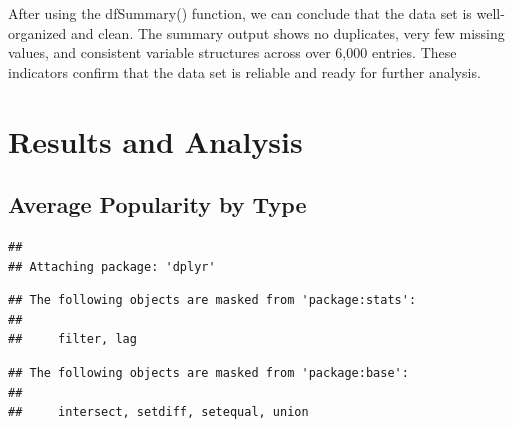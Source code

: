 \documentclass[11pt,preprint]{elsarticle}
\numberwithin{equation}{section}
\numberwithin{figure}{section}
\numberwithin{table}{section}
\begin{document}
After using the dfSummary() function, we can conclude that the data set
is well-organized and clean. The summary output shows no duplicates,
very few missing values, and consistent variable structures across over
6,000 entries. These indicators confirm that the data set is reliable
and ready for further analysis.

\section{Results and Analysis}\label{results-and-analysis}

\subsection{Average Popularity by
Type}\label{average-popularity-by-type}

\begin{Shaded}
\begin{Highlighting}[]
\end{Highlighting}
\end{Shaded}

\begin{verbatim}
## 
## Attaching package: 'dplyr'
\end{verbatim}

\begin{verbatim}
## The following objects are masked from 'package:stats':
## 
##     filter, lag
\end{verbatim}

\begin{verbatim}
## The following objects are masked from 'package:base':
## 
##     intersect, setdiff, setequal, union
\end{verbatim}
\end{document}
